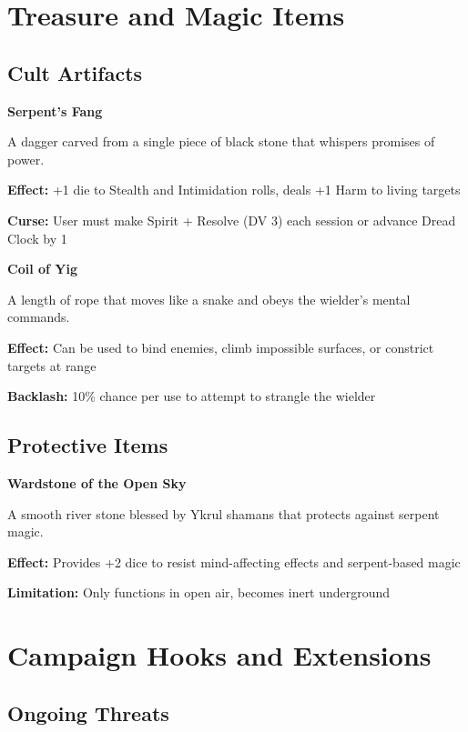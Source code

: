 \documentclass[12pt,twoside]{article}
\newenvironment{npcbox}[1]{
  \begin{mdframed}[
    linewidth=1pt,
    linecolor=dungeongray,
    backgroundcolor=white,
    innertopmargin=5pt,
    innerbottommargin=5pt,
    innerrightmargin=5pt,
    innerleftmargin=5pt
  ]
  \textbf{#1}
}{\end{mdframed}}
\begin{document}
\section{Treasure and Magic Items}

\subsection{Cult Artifacts}

\begin{npcbox}{Serpent's Fang}
A dagger carved from a single piece of black stone that whispers promises of power.

\textbf{Effect:} +1 die to Stealth and Intimidation rolls, deals +1 Harm to living targets

\textbf{Curse:} User must make Spirit + Resolve (DV 3) each session or advance Dread Clock by 1
\end{npcbox}

\begin{npcbox}{Coil of Yig}
A length of rope that moves like a snake and obeys the wielder's mental commands.

\textbf{Effect:} Can be used to bind enemies, climb impossible surfaces, or constrict targets at range

\textbf{Backlash:} 10\% chance per use to attempt to strangle the wielder
\end{npcbox}

\subsection{Protective Items}

\begin{npcbox}{Wardstone of the Open Sky}
A smooth river stone blessed by Ykrul shamans that protects against serpent magic.

\textbf{Effect:} Provides +2 dice to resist mind-affecting effects and serpent-based magic

\textbf{Limitation:} Only functions in open air, becomes inert underground
\end{npcbox}

\section{Campaign Hooks and Extensions}

\subsection{Ongoing Threats}
\end{document}
